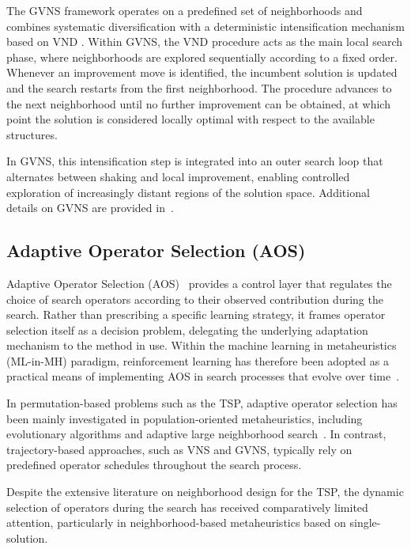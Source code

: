 \documentclass[runningheads]{llncs}
\begin{document}
The GVNS framework operates on a predefined set of neighborhoods and combines systematic diversification with a deterministic 
intensification mechanism based on VND \cite{HANSEN2017423}. Within GVNS, the VND procedure 
acts as the main local search phase, where neighborhoods are explored sequentially according to a fixed 
order. Whenever an improvement move is identified, the incumbent solution is updated and the search restarts from the first neighborhood. The procedure advances to the next neighborhood until no further improvement can be obtained, at which point the solution is considered locally optimal with respect to the available structures.

In GVNS, this intensification step is integrated into an outer search loop that alternates between shaking and local improvement, enabling controlled exploration of increasingly distant regions of the solution space. 
Additional details on GVNS are provided in~\cite{HANSEN2017423,hansen2008vns}.



\subsection{Adaptive Operator Selection (AOS)}


Adaptive Operator Selection (AOS)~\cite{fialho2010analyzing} provides a control layer that regulates the choice of search operators according to their observed contribution during the search. Rather than prescribing a specific learning strategy, it frames operator selection itself as a decision problem, delegating the underlying adaptation mechanism to the method in use. Within the machine learning in metaheuristics (ML-in-MH) paradigm, reinforcement learning has therefore been adopted as a practical means of implementing AOS in search processes that evolve over time~\cite{KARIMIMAMAGHAN2022393}.

In permutation-based problems such as the TSP, adaptive operator selection has been mainly investigated in population-oriented metaheuristics, including evolutionary algorithms and adaptive large neighborhood search~\cite{QUEIROZDOSSANTOS20144939,Alipour2018}. In contrast, trajectory-based approaches, such as VNS and GVNS, typically rely on predefined operator schedules throughout the search process. 

Despite the extensive literature on neighborhood design for the TSP, the dynamic selection of operators during the search has received comparatively limited attention, particularly in neighborhood-based metaheuristics based on single-solution.
\end{document}
